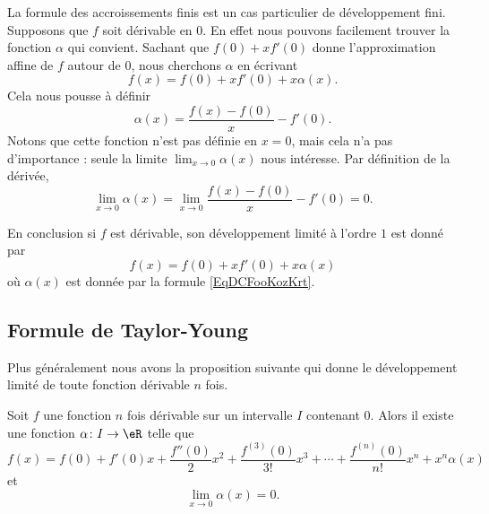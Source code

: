 La formule des accroissements finis est un cas particulier de développement fini. Supposons que \( f\) soit dérivable en \( 0\). En effet nous pouvons facilement trouver la fonction \( \alpha\) qui convient. Sachant que \( f(0)+xf'(0)\) donne l'approximation affine de \( f\) autour de \( 0\), nous cherchons \( \alpha\) en écrivant
\begin{equation}
    f(x)=f(0)+xf'(0)+x\alpha(x).
\end{equation}
Cela nous pousse à définir
\begin{equation}    \label{EqDCFooKozKrt}
    \alpha(x)=\frac{ f(x)-f(0) }{ x }-f'(0).
\end{equation}
Notons que cette fonction n'est pas définie en \( x=0\), mais cela n'a pas d'importance : seule la limite \( \lim_{x\to 0} \alpha(x)\) nous intéresse. Par définition de la dérivée,
\begin{equation}
    \lim_{x\to 0} \alpha(x)=\lim_{x\to 0} \frac{ f(x)-f(0) }{ x }-f'(0)=0.
\end{equation}

En conclusion si \( f\) est dérivable, son développement limité à l'ordre \(  1\) est donné par
\begin{equation}
    f(x)=f(0)+xf'(0)+x\alpha(x)
\end{equation}
où \( \alpha(x)\) est donnée par la formule \eqref{EqDCFooKozKrt}.

\subsection{Formule de Taylor-Young}

Plus généralement nous avons la proposition suivante qui donne le développement limité de toute fonction dérivable \( n\) fois.

\begin{proposition}    \label{PropVDGooCexFwy}
    Soit \( f\) une fonction \( n\) fois dérivable sur un intervalle \( I\) contenant \( 0\). Alors il existe une fonction \( \alpha\colon I\to \eR\) telle que
    \begin{equation}        \label{EQooBKZDooTqYyIB}
        f(x)=f(0)+f'(0)x+\frac{ f''(0) }{ 2 }x^2+\frac{ f^{(3)}(0) }{ 3! }x^3+\cdots +\frac{ f^{(n)}(0) }{ n! }x^n+x^n\alpha(x)
    \end{equation}
    et
    \begin{equation}
        \lim_{x\to 0} \alpha(x)=0.
    \end{equation}
\end{proposition}

